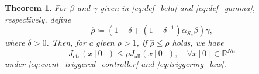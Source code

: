 \documentclass[letterpaper,10pt,conference]{ieeeconf}
\newtheorem{theorem}{Theorem}
\newcommand{\R}{\mathbb{R}}
\begin{document}
\begin{theorem} \label{th:lq_performance_guarantee}
  For $\beta$ and $\gamma$ given in \eqref{eq:def_beta} and \eqref{eq:def_gamma}, respectively, define
  \begin{equation} \label{eq:def_rhostar}
    \hat\rho \coloneqq \left( 1+\delta +\left(1 + \delta^{-1}\right)\alpha_{S_u} \beta \right)\gamma,
  \end{equation}
  where $\delta > 0$.
  Then, for a given $\rho > 1$, if $\hat\rho \leq \rho$ holds, we have
  \begin{equation} \label{eq:lq_performance_guaratee}
    J_{\mathrm{etc}}(x[0]) \leq \rho J_{\mathrm{all}}(x[0]),\quad \forall x[0] \in \R^{Nn}
  \end{equation}
  under \eqref{eq:event_triggered_controller} and \eqref{eq:triggering_law}.
\end{theorem}
\end{document}
